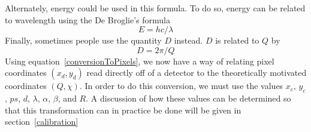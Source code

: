 Alternately, energy could be used in this formula.
To do so, energy can be related to wavelength using
the De Broglie's formula
\begin{equation}
E = hc/\lambda
\end{equation}
Finally, sometimes people use the quantity $D$ instead.
$D$ is related to $Q$ by
\begin{equation}\label{DtermsQ}
    D = 2\pi/Q
\end{equation}
Using equation~\ref{conversionToPixels},
we now have a way of relating pixel
coordinates $(x_d,y_d)$ read directly off
of a detector to the
theoretically motivated coordinates $(Q,\chi)$.
In order to do this conversion, we must use
the values $x_c$, $y_c$, $ps$, $d$, $\lambda$,
$\alpha$, $\beta$, and $R$. A discussion of
how these values can be determined so that
this transformation can in practice be done
will be given in section~\ref{calibration}


%
%
%
